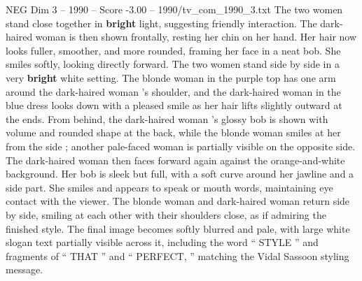\begin{textsample}{NEG Dim 3 – 1990 – Score -3.00 – 1990/tv\_com\_1990\_3.txt}
The two women stand close together in \textbf{bright} light, suggesting friendly interaction.
The dark-haired woman is then shown frontally, resting her chin on her hand.
Her hair now looks fuller, smoother, and more rounded, framing her face in a neat bob.
She smiles softly, looking directly forward.
The two women stand side by side in a very \textbf{bright} white setting.
The blonde woman in the purple top has one arm around the dark-haired woman ’s shoulder, and the dark-haired woman in the blue dress looks down with a pleased smile as her hair lifts slightly outward at the ends.
From behind, the dark-haired woman ’s glossy bob is shown with volume and rounded shape at the back, while the blonde woman smiles at her from the side ; another pale-faced woman is partially visible on the opposite side.
The dark-haired woman then faces forward again against the orange-and-white background.
Her bob is sleek but full, with a soft curve around her jawline and a side part.
She smiles and appears to speak or mouth words, maintaining eye contact with the viewer.
The blonde woman and dark-haired woman return side by side, smiling at each other with their shoulders close, as if admiring the finished style.
The final image becomes softly blurred and pale, with large white slogan text partially visible across it, including the word “ STYLE ” and fragments of “ THAT ” and “ PERFECT, ” matching the Vidal Sassoon styling message.

\end{textsample}
